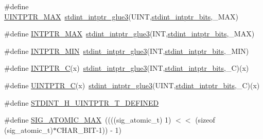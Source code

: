 \begin{DoxyCompactItemize}
\item 
\#define \hyperlink{orstdint_8h_ab2355300ea19395357e62d780f4dd073}{U\-I\-N\-T\-P\-T\-R\-\_\-\-M\-A\-X}~\hyperlink{orstdint_8h_a45b6674a3fc19b6f9017e8eff6de40f2}{stdint\-\_\-intptr\-\_\-glue3}(U\-I\-N\-T,\hyperlink{orstdint_8h_a7920cf8565293f3312fe4a5a8829483b}{stdint\-\_\-intptr\-\_\-bits},\-\_\-\-M\-A\-X)
\item 
\#define \hyperlink{orstdint_8h_a9e5742f2bae4a5283431a3c03499e3a9}{I\-N\-T\-P\-T\-R\-\_\-\-M\-A\-X}~\hyperlink{orstdint_8h_a45b6674a3fc19b6f9017e8eff6de40f2}{stdint\-\_\-intptr\-\_\-glue3}(I\-N\-T,\hyperlink{orstdint_8h_a7920cf8565293f3312fe4a5a8829483b}{stdint\-\_\-intptr\-\_\-bits},\-\_\-\-M\-A\-X)
\item 
\#define \hyperlink{orstdint_8h_a2aaa6d3aa1d7d1e0e326955aa24db752}{I\-N\-T\-P\-T\-R\-\_\-\-M\-I\-N}~\hyperlink{orstdint_8h_a45b6674a3fc19b6f9017e8eff6de40f2}{stdint\-\_\-intptr\-\_\-glue3}(I\-N\-T,\hyperlink{orstdint_8h_a7920cf8565293f3312fe4a5a8829483b}{stdint\-\_\-intptr\-\_\-bits},\-\_\-\-M\-I\-N)
\item 
\#define \hyperlink{orstdint_8h_af85552d83091732cc970c1713d8e091b}{I\-N\-T\-P\-T\-R\-\_\-\-C}(x)~\hyperlink{orstdint_8h_a45b6674a3fc19b6f9017e8eff6de40f2}{stdint\-\_\-intptr\-\_\-glue3}(I\-N\-T,\hyperlink{orstdint_8h_a7920cf8565293f3312fe4a5a8829483b}{stdint\-\_\-intptr\-\_\-bits},\-\_\-\-C)(x)
\item 
\#define \hyperlink{orstdint_8h_ad0fb0bc6474117fa96da4abd1cb7a70b}{U\-I\-N\-T\-P\-T\-R\-\_\-\-C}(x)~\hyperlink{orstdint_8h_a45b6674a3fc19b6f9017e8eff6de40f2}{stdint\-\_\-intptr\-\_\-glue3}(U\-I\-N\-T,\hyperlink{orstdint_8h_a7920cf8565293f3312fe4a5a8829483b}{stdint\-\_\-intptr\-\_\-bits},\-\_\-\-C)(x)
\item 
\#define \hyperlink{orstdint_8h_a0c58c27c9332ac03e508bb0674f15ad6}{S\-T\-D\-I\-N\-T\-\_\-\-H\-\_\-\-U\-I\-N\-T\-P\-T\-R\-\_\-\-T\-\_\-\-D\-E\-F\-I\-N\-E\-D}
\item 
\#define \hyperlink{orstdint_8h_a1f5fe9445d0ad0bee21bab1de4cc3e58}{S\-I\-G\-\_\-\-A\-T\-O\-M\-I\-C\-\_\-\-M\-A\-X}~((((sig\-\_\-atomic\-\_\-t) 1) $<$$<$ (sizeof (sig\-\_\-atomic\-\_\-t)$\ast$C\-H\-A\-R\-\_\-\-B\-I\-T-\/1)) -\/ 1)
\end{DoxyCompactItemize}
